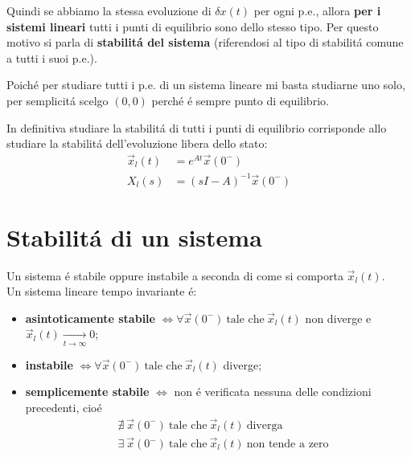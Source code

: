 \documentclass[../main.tex]{subfiles}
\begin{document}
		Quindi se abbiamo la stessa evoluzione di $ \delta x(t) $ per ogni p.e., allora \textbf{per i sistemi lineari} tutti i punti di equilibrio sono dello stesso tipo. Per questo motivo si parla di \textbf{stabilit\'a del sistema} (riferendosi al tipo di stabilit\'a comune a tutti i suoi p.e.).
		
		Poich\'e per studiare tutti i p.e. di un sistema lineare mi basta studiarne uno solo, per semplicit\'a scelgo $ (0,0) $ perch\'e \'e sempre punto di equilibrio. 
		
		In definitiva studiare la stabilit\'a di tutti i punti di equilibrio corrisponde allo studiare la stabilit\'a dell'evoluzione libera dello stato:
		\begin{align*}
			\vec x_l(t) &= e^{At} \vec x(0^-)\\
			X_l(s) &= (sI-A)^{-1} \vec x(0^-)
		\end{align*}
		
	\section{Stabilit\'a di un sistema}
		Un sistema \'e stabile oppure instabile a seconda di come si comporta $ \vec x_l(t) $.\\
		\linebreak
		Un sistema lineare tempo invariante \'e:
		\begin{itemize}
			\item
				\textbf{asintoticamente stabile} $ \Leftrightarrow  \forall \vec x(0^-)\ \text{tale che}\ \vec x_l(t) $ non diverge e $ \vec x_l(t) \xrightarrow[t \rightarrow \infty]{} 0 $;
			\item
				\textbf{instabile} $ \Leftrightarrow  \forall \vec x(0^-)\ \text{tale che}\ \vec x_l(t) $ diverge;
			\item
				\textbf{semplicemente stabile} $ \Leftrightarrow $ non \'e verificata nessuna delle condizioni precedenti, cio\'e
				\begin{align*}
					&\nexists\ \vec x(0^-)\ \text{tale che}\ \vec x_l(t)\ \text{diverga}\\
					&\exists\ \vec x(0^-)\ \text{tale che}\ \vec x_l(t)\ \text{non tende a zero}
				\end{align*}
		\end{itemize}
	
\end{document}
